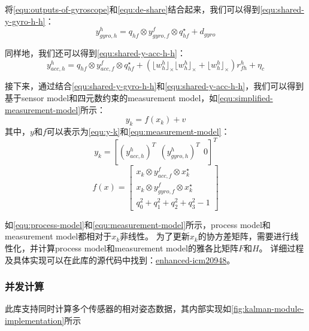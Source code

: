 将\autoref{equ:outputs-of-gyroscope}和\autoref{equ:de-share}结合起来，我们可以得到\autoref{equ:shared-y-gyro-h-h}：
\begin{equation}
    \label{equ:shared-y-gyro-h-h}
    y_{gyro,h}^h = q_{hf} \otimes y_{gyro,f}^f \otimes q_{hf}^{\star} + d_{gyro}
\end{equation}

同样地，我们还可以得到\autoref{equ:shared-y-acc-h-h}：
\begin{equation}
    \label{equ:shared-y-acc-h-h}
    y_{acc,h}^h = q_{hf} \otimes y_{acc,f}^f \otimes q_{hf}^{\star} + (\lfloor w_h^h \rfloor_{\times} \lfloor w_h^h \rfloor_{\times} + \lfloor w_h^h \rfloor_{\times})r_{fh}^h  + \eta_c
\end{equation}

接下来，通过结合\autoref{equ:shared-y-gyro-h-h}和\autoref{equ:shared-y-acc-h-h}，我们可以得到基于sensor model和四元数约束的measurement model，如\autoref{equ:simplified-measurement-model}所示：
\begin{equation}
    \label{equ:simplified-measurement-model}
    y_k = f(x_k) + v
\end{equation}
其中，$y$和$f$可以表示为\autoref{equ:y-k}和\autoref{equ:measurement-model}：
\begin{equation}
    \label{equ:y-k}
    y_k = {[{(y_{acc,h}^h)}^T\ \ {(y_{gyro,h}^h)}^T\ \ 0]}^T
\end{equation}
\begin{equation}
    \label{equ:measurement-model}
    f(x) = \begin{bmatrix}
        x_k \otimes y_{acc,f}^f \otimes x_k^{\star} \\
        x_k \otimes y_{gyro,f}^f \otimes x_k^{\star} \\
        q_0^2 + q_1^2 + q_2^2 + q_3^2 - 1
    \end{bmatrix}
\end{equation}

如\autoref{equ:process-model}和\autoref{equ:measurement-model}所示，process model和measurement model都相对于$x_k$非线性。
为了更新$x_k$的协方差矩阵，需要进行线性化，并计算process model和measurement model的雅各比矩阵$F$和$H$。
详细过程及具体实现可以在此库的源代码中找到：\href{https://pypi.org/project/enhanced-icm20948/}{enhanced-icm20948}。
\subsubsection{并发计算}
此库支持同时计算多个传感器的相对姿态数据，其内部实现如\autoref{fig:kalman-module-implementation}所示

